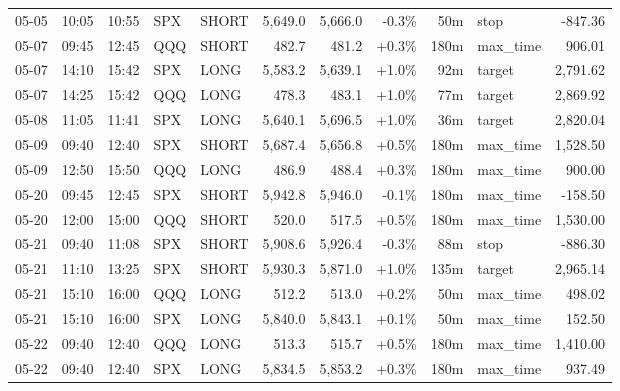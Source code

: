 \documentclass[11pt,a4paper,twoside]{article}
\begin{document}
\begin{center}
\begin{longtable}{>{\color{txtmain}}l l l l l r r r r >{\color{txtmain}}l r}
05-05 & 10:05 & 10:55 & SPX & SHORT & 5,649.0 & 5,666.0 & \textcolor{lossred}{-0.3\%} & 50m & stop & \textcolor{lossred}{-847.36} \\
05-07 & 09:45 & 12:45 & QQQ & SHORT & 482.7 & 481.2 & \textcolor{wingreen}{+0.3\%} & 180m & max\_time & \textcolor{wingreen}{906.01} \\
05-07 & 14:10 & 15:42 & SPX & LONG & 5,583.2 & 5,639.1 & \textcolor{wingreen}{+1.0\%} & 92m & target & \textcolor{wingreen}{2,791.62} \\
05-07 & 14:25 & 15:42 & QQQ & LONG & 478.3 & 483.1 & \textcolor{wingreen}{+1.0\%} & 77m & target & \textcolor{wingreen}{2,869.92} \\
05-08 & 11:05 & 11:41 & SPX & LONG & 5,640.1 & 5,696.5 & \textcolor{wingreen}{+1.0\%} & 36m & target & \textcolor{wingreen}{2,820.04} \\
05-09 & 09:40 & 12:40 & SPX & SHORT & 5,687.4 & 5,656.8 & \textcolor{wingreen}{+0.5\%} & 180m & max\_time & \textcolor{wingreen}{1,528.50} \\
05-09 & 12:50 & 15:50 & QQQ & LONG & 486.9 & 488.4 & \textcolor{wingreen}{+0.3\%} & 180m & max\_time & \textcolor{wingreen}{900.00} \\
05-20 & 09:45 & 12:45 & SPX & SHORT & 5,942.8 & 5,946.0 & \textcolor{lossred}{-0.1\%} & 180m & max\_time & \textcolor{lossred}{-158.50} \\
05-20 & 12:00 & 15:00 & QQQ & SHORT & 520.0 & 517.5 & \textcolor{wingreen}{+0.5\%} & 180m & max\_time & \textcolor{wingreen}{1,530.00} \\
05-21 & 09:40 & 11:08 & SPX & SHORT & 5,908.6 & 5,926.4 & \textcolor{lossred}{-0.3\%} & 88m & stop & \textcolor{lossred}{-886.30} \\
05-21 & 11:10 & 13:25 & SPX & SHORT & 5,930.3 & 5,871.0 & \textcolor{wingreen}{+1.0\%} & 135m & target & \textcolor{wingreen}{2,965.14} \\
05-21 & 15:10 & 16:00 & QQQ & LONG & 512.2 & 513.0 & \textcolor{wingreen}{+0.2\%} & 50m & max\_time & \textcolor{wingreen}{498.02} \\
05-21 & 15:10 & 16:00 & SPX & LONG & 5,840.0 & 5,843.1 & \textcolor{wingreen}{+0.1\%} & 50m & max\_time & \textcolor{wingreen}{152.50} \\
05-22 & 09:40 & 12:40 & QQQ & LONG & 513.3 & 515.7 & \textcolor{wingreen}{+0.5\%} & 180m & max\_time & \textcolor{wingreen}{1,410.00} \\
05-22 & 09:40 & 12:40 & SPX & LONG & 5,834.5 & 5,853.2 & \textcolor{wingreen}{+0.3\%} & 180m & max\_time & \textcolor{wingreen}{937.49} \\

\end{longtable}
\end{center}
\end{document}
